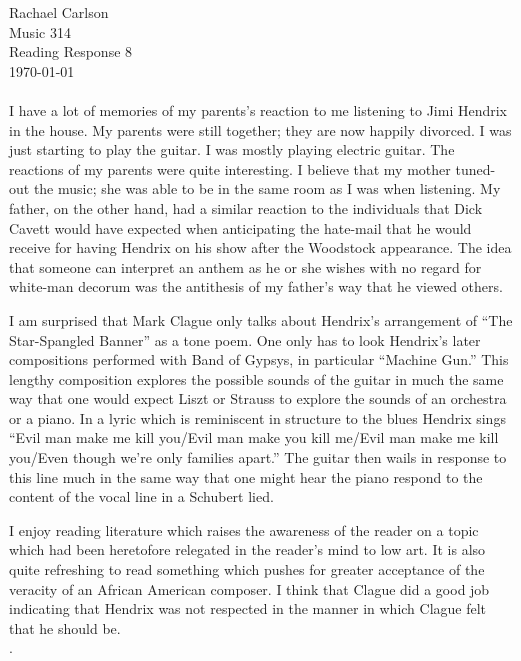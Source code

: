 \documentclass[12pt]{article}
\begin{document}
\noindent Rachael Carlson\\
Music 314\\
Reading Response 8\\
\today\\

\noindent{}\\

\noindent I have a lot of memories of my parents's reaction to me listening to Jimi Hendrix in the house. My parents were still together; they are now happily divorced. I was just starting to play the guitar. I was mostly playing electric guitar. The reactions of my parents were quite interesting. I believe that my mother tuned-out the music; she was able to be in the same room as I was when listening. My father, on the other hand, had a similar reaction to the individuals that Dick Cavett would have expected when anticipating the hate-mail that he would receive for having Hendrix on his show after the Woodstock appearance.\autocite{hendrixWoodstock} The idea that someone can interpret an anthem as he or she wishes with no regard for white-man decorum was the antithesis of my father’s way that he viewed others. 

I am surprised that Mark Clague only talks about Hendrix’s arrangement of “The Star-Spangled Banner” as a tone poem. One only has to look Hendrix’s later compositions performed with Band of Gypsys, in particular “Machine Gun.” This lengthy composition explores the possible sounds of the guitar in much the same way that one would expect Liszt or Strauss to explore the sounds of an orchestra or a piano. In a lyric which is reminiscent in structure to the blues Hendrix sings “Evil man make me kill you/Evil man make you kill me/Evil man make me kill you/Even though we’re only families apart.” The guitar then wails in response to this line much in the same way that one might hear the piano respond to the content of the vocal line in a Schubert lied.

I enjoy reading literature which raises the awareness of the reader on a topic which had been heretofore relegated in the reader’s mind to low art. It is also quite refreshing to read something which pushes for greater acceptance of the veracity of an African American composer. I think that Clague did a good job indicating that Hendrix was not respected in the manner in which Clague felt that he should be.\\

\noindent{}.\\
\end{document}
